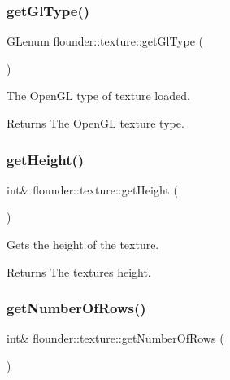 \subsubsection{\texorpdfstring{get\+Gl\+Type()}{getGlType()}}
{\footnotesize\ttfamily G\+Lenum flounder\+::texture\+::get\+Gl\+Type (\begin{DoxyParamCaption}{ }\end{DoxyParamCaption})\hspace{0.3cm}{\ttfamily [inline]}}



The Open\+GL type of texture loaded. 

\begin{DoxyReturn}{Returns}
The Open\+GL texture type. 
\end{DoxyReturn}
\mbox{\label{classflounder_1_1texture_a9e96af5833ca7e542366e0440d820d67}} 
\subsubsection{\texorpdfstring{get\+Height()}{getHeight()}}
{\footnotesize\ttfamily int\& flounder\+::texture\+::get\+Height (\begin{DoxyParamCaption}{ }\end{DoxyParamCaption})\hspace{0.3cm}{\ttfamily [inline]}}



Gets the height of the texture. 

\begin{DoxyReturn}{Returns}
The textures height. 
\end{DoxyReturn}
\mbox{\label{classflounder_1_1texture_adaf850aeb5d498673962a9067d40463a}} 
\subsubsection{\texorpdfstring{get\+Number\+Of\+Rows()}{getNumberOfRows()}}
{\footnotesize\ttfamily int\& flounder\+::texture\+::get\+Number\+Of\+Rows (\begin{DoxyParamCaption}{ }\end{DoxyParamCaption})\hspace{0.3cm}{\ttfamily [inline]}}



